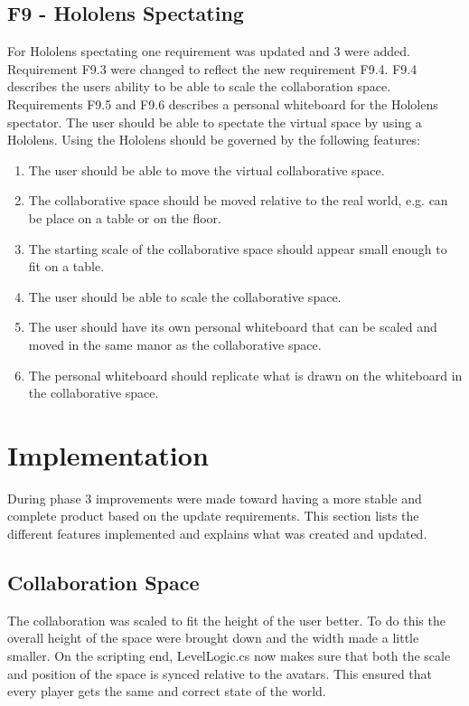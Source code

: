         \subsection{F9 - Hololens Spectating}
        For Hololens spectating one requirement was updated and 3 were added. Requirement F9.3 were changed to reflect the new requirement F9.4. F9.4 describes the users ability to be able to scale the collaboration space. Requirements F9.5 and F9.6 describes a personal whiteboard for the Hololens spectator.
        \newline\newline
        The user should be able to spectate the virtual space by using a Hololens. Using the Hololens should be governed by the following features:
        \begin{enumerate}
            \item The user should be able to move the virtual collaborative space.
            \item The collaborative space should be moved relative to the real world, e.g. can be place on a table or on the floor.
            \item The starting scale of the collaborative space should appear small enough to fit on a table.
            \item The user should be able to scale the collaborative space.
            \item The user should have its own personal whiteboard that can be scaled and moved in the same manor as the collaborative space.
            \item The personal whiteboard should replicate what is drawn on the whiteboard in the collaborative space.
        \end{enumerate}
    
    
    \section{Implementation} %
    During phase 3 improvements were made toward having a more stable and complete product based on the update requirements. This section lists the different features implemented and explains what was created and updated.
    
        \subsection{Collaboration Space}
        The collaboration was scaled to fit the height of the user better. To do this the overall height of the space were brought down and the width made a little smaller. On the scripting end, LevelLogic.cs now makes sure that both the scale and position of the space is synced relative to the avatars. This ensured that every player gets the same and correct state of the world.
        
